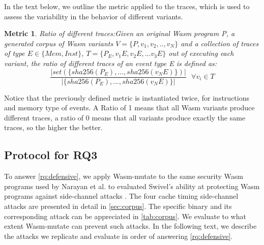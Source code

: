\documentclass[sigplan,screen]{acmart}
\newcommand*\badge[1]{ \colorbox{red}{\color{white}#1}}
\newcommand{\tool}{Wasm-mutate\xspace}
\newcommand{\wasm}{Wasm\xspace}
\newtheorem{metric}{Metric}
\newcommand*\step[1]{
\noindent\tikz[baseline=(char.base)]{
        \node[shape=circle,text=black,draw=black, fill=white,inner sep=1.2pt] (char) {#1};}}
\newcommand{\todo}[1]{%
\refstepcounter{todo}
\noindent\textbf{\badge{TODO}} {\color{red}#1}
\addcontentsline{td}{todo}
{\color{red}\thesection.\thetodo\xspace #1}}
\begin{document}
In the text below, we outline the metric applied to the traces, which is used to assess the variability in the behavior of different variants.

\begin{metric}{Ratio of different traces:}\label{metric:mem:sha}
Given an original \wasm program P, a generated corpus of \wasm variants $V=\{P,v_1, v_2, .., v_N\}$ and a collection of traces of type $E\in \{Mem, Inst\}$, $T=\{P_E, v_1E, v_2E, ...v_3E\}$ out of executing each variant, the ratio of different traces of an event type E is defined as:
$$
    \frac{| set(\{ sha256({P_E}),..., sha256(v_NE) \})|}{| \{ sha256(P_E),..., sha256(v_NE) \}|}\text{ } \forall v_i \in T
$$

\end{metric}

Notice that the previously defined metric is instantiated twice, for instructions and memory type of events.
A Ratio of 1 means that all \wasm variants produce different traces, a ratio of 0 means that all variants produce exactly the same traces, so the higher the better.



\subsection{Protocol for RQ3}
\label{protocol:rq3}

\newcommand{\poct}{\emph{Cache timing POC}\xspace}
\newcommand{\pocd}{\emph{Differential computing POC}\xspace}
\newcommand{\pocp}{\emph{Port contention POC}\xspace}

To answer \ref{rq:defensive}, we apply \tool to the same security \wasm programs used by Narayan et al. to evaluated Swivel's ability at protecting \wasm programs against side-channel attacks \cite{Swivel}. 
The four cache timing side-channel attacks are presented in detail in \autoref{sec:corpus}. 
The specific binary and its corresponding attack can be appreciated in \autoref{tab:corpus}.
We evaluate to what extent \tool can prevent such attacks.
In the following text, we describe the attacks we replicate and evaluate in order of answering \ref{rq:defensive}.
\end{document}
